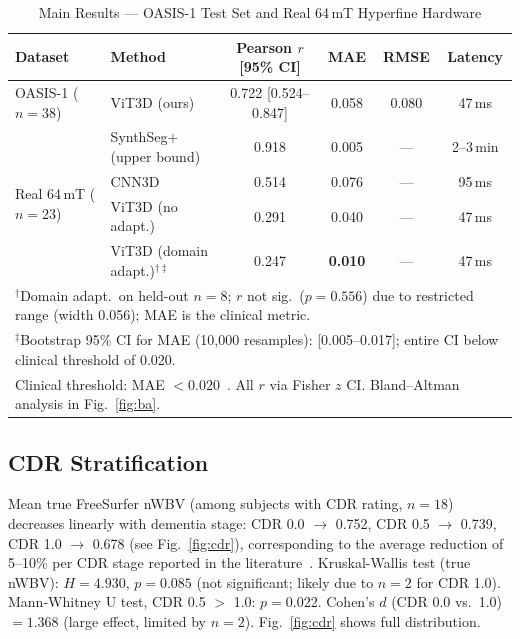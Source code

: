 \documentclass[12pt,a4paper]{article}
\begin{document}
\begin{table}[!t]
\caption{Main Results --- OASIS-1 Test Set and Real 64\,mT Hyperfine Hardware}
\label{tab:oasis}
\centering
\setlength{\tabcolsep}{6pt}
\begin{tabular}{llcccc}
\toprule
Dataset & Method & Pearson $r$ [95\% CI] & MAE & RMSE & Latency \\
\midrule
OASIS-1 ($n=38$)
  & ViT3D (ours) & 0.722 [0.524--0.847] & 0.058 & 0.080 & 47\,ms \\
\midrule
\multirow{4}{*}{Real 64\,mT ($n=23$)}
  & SynthSeg+ (upper bound)              & 0.918 & 0.005          & --- & 2--3\,min \\
  & CNN3D                                & 0.514 & 0.076          & --- & 95\,ms    \\
  & ViT3D (no adapt.)                    & 0.291 & 0.040          & --- & 47\,ms    \\
  & ViT3D (domain adapt.)$^{\dagger\ddagger}$ & 0.247 & \textbf{0.010} & --- & 47\,ms    \\
\bottomrule
\multicolumn{6}{l}{\footnotesize $^\dagger$Domain adapt.\ on held-out $n=8$; $r$ not sig.\ ($p=0.556$) due to restricted range (width 0.056); MAE is the clinical metric.}\\
\multicolumn{6}{l}{\footnotesize $^\ddagger$Bootstrap 95\% CI for MAE (10{,}000 resamples): [0.005--0.017]; entire CI below clinical threshold of 0.020.}\\
\multicolumn{6}{l}{\footnotesize Clinical threshold: MAE $< 0.020$~\cite{buckner2004}. All $r$ via Fisher $z$ CI. Bland--Altman analysis in Fig.~\ref{fig:ba}.}
\end{tabular}
\end{table}

\subsection{CDR Stratification}

Mean true FreeSurfer nWBV (among subjects with CDR rating, $n = 18$)
decreases linearly with dementia stage: CDR 0.0 $\to$ 0.752, CDR 0.5 $\to$
0.739, CDR 1.0 $\to$ 0.678 (see Fig.~\ref{fig:cdr}), corresponding to the
average reduction of 5--10\% per CDR stage reported in the
literature~\cite{fotenos2005}. Kruskal-Wallis test (true nWBV): $H = 4.930$,
$p = 0.085$ (not significant; likely due to $n = 2$ for CDR 1.0).
Mann-Whitney U test, CDR 0.5 $>$ 1.0: $p = 0.022$. Cohen's $d$ (CDR 0.0
vs.\ 1.0) $= 1.368$ (large effect, limited by $n = 2$). Fig.~\ref{fig:cdr}
shows full distribution.
\end{document}
